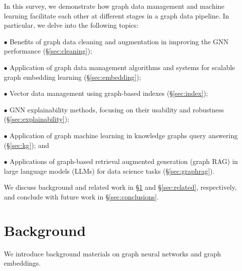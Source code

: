\documentclass{sig-alternate-10pt}
\newcommand{\spara}[1]{\smallskip\noindent{\bf #1}}
\begin{document}
\spara{Roadmap.}
%
In this survey, we demonstrate how graph data management and machine learning facilitate each other at different stages
in a graph data pipeline. In particular, we delve into the following topics:

\noindent$\bullet$ Benefits of graph data cleaning and augmentation in improving the GNN performance (\S \ref{sec:cleaning});

\noindent$\bullet$ Application of graph data management algorithms and systems for scalable graph embedding learning (\S \ref{sec:embedding});

\noindent$\bullet$ Vector data management using graph-based indexes (\S \ref{sec:index});

\noindent$\bullet$ GNN explainability methods, focusing on their usability and robustness (\S \ref{sec:explainability});

\noindent$\bullet$ Application of graph machine learning in knowledge graphs query answering (\S \ref{sec:kg}); and

\noindent$\bullet$  Applications of graph-based retrieval augmented generation (graph RAG) in large language models (LLMs) for data science tasks (\S \ref{sec:graphrag}).

We discuss background and related work in \S \ref{sec:background} and \S \ref{sec:related}, respectively, and conclude with future work in \S \ref{sec:conclusions}.


\section{Background}
\label{sec:background}

\medskip
\medskip

We introduce background materials on graph neural networks and graph embeddings.
\end{document}
